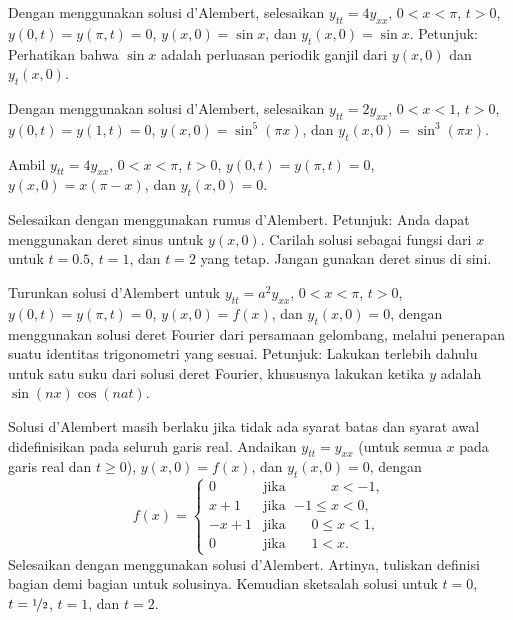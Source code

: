 \begin{exercise}
Dengan menggunakan solusi d'Alembert, selesaikan $y_{tt} = 4y_{xx}$, $0 < x < \pi$, $t >
0$,
$y(0,t) = y(\pi, t) = 0$, $y(x,0) = \sin x$, dan
$y_t(x,0) = \sin x$.  Petunjuk: Perhatikan bahwa $\sin x$ adalah perluasan periodik ganjil dari
$y(x,0)$ dan $y_t(x,0)$.
\end{exercise}

\begin{exercise}
Dengan menggunakan solusi d'Alembert, selesaikan $y_{tt} = 2y_{xx}$, $0 < x < 1$, $t > 0$,
$y(0,t) = y(1, t) = 0$, $y(x,0) = \sin^5 (\pi x)$, dan
$y_t(x,0) = \sin^3 (\pi x)$.
\end{exercise}

\begin{exercise}
Ambil
$y_{tt} = 4y_{xx}$, $0 < x < \pi$, $t > 0$,
$y(0,t) = y(\pi, t) = 0$, $y(x,0) = x(\pi-x)$, dan
$y_t(x,0) = 0$.
\begin{tasks}
\task Selesaikan dengan menggunakan rumus d'Alembert.  Petunjuk: Anda dapat menggunakan deret sinus
untuk $y(x,0)$.
\task Carilah solusi sebagai fungsi dari $x$ untuk $t=0.5$, $t=1$, dan
$t=2$ yang tetap.  Jangan gunakan deret sinus di sini.
\end{tasks}
\end{exercise}

\begin{exercise}
Turunkan solusi d'Alembert untuk $y_{tt} = a^2 y_{xx}$, $0 < x < \pi$, $t >
0$,
$y(0,t) = y(\pi, t) = 0$, $y(x,0) = f(x)$, dan
$y_t(x,0) = 0$, dengan menggunakan solusi deret Fourier dari persamaan gelombang,
melalui penerapan suatu identitas trigonometri yang sesuai.
Petunjuk: Lakukan terlebih dahulu untuk satu suku dari solusi deret Fourier,
khususnya lakukan ketika $y$ adalah
$\sin(n  x )\cos(n a t )$.
\end{exercise}

\begin{exercise}
Solusi d'Alembert masih berlaku jika tidak ada syarat batas dan
syarat awal didefinisikan pada seluruh garis real.  Andaikan
$y_{tt} = y_{xx}$ (untuk semua $x$ pada garis real dan $t \geq 0$),
$y(x,0) = f(x)$, dan
$y_t(x,0) = 0$, dengan
\begin{equation*}
f(x) =
\begin{cases}
0 & \text{jika } \; \phantom{{-1} \leq {} }x < -1, \\
x+1 & \text{jika } \; {-1} \leq x < 0, \\
-x+1 & \text{jika } \; \phantom{-}0 \leq x < 1, \\
0 & \text{jika } \; \phantom{-}1 < x .
\end{cases}
\end{equation*}
Selesaikan dengan menggunakan solusi d'Alembert. Artinya, tuliskan definisi
bagian demi bagian untuk solusinya.  Kemudian sketsalah solusi untuk $t=0$,
$t=\nicefrac{1}{2}$, $t=1$, dan $t=2$.
\end{exercise}

